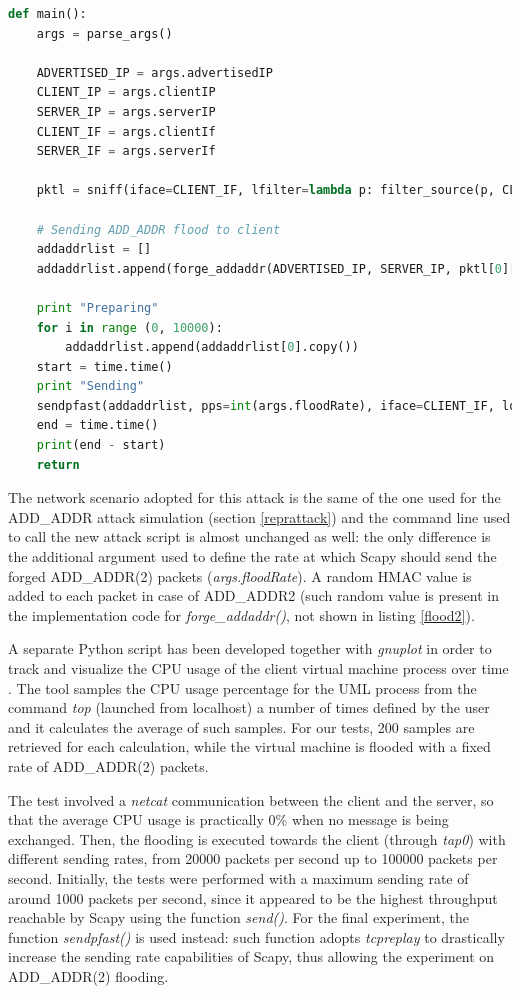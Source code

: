 \begin{lstlisting}[language=Python, caption=Scapy flooding tool (\textit{main()} function), label=flood2]
def main():
    args = parse_args()

    ADVERTISED_IP = args.advertisedIP
    CLIENT_IP = args.clientIP
    SERVER_IP = args.serverIP
    CLIENT_IF = args.clientIf
    SERVER_IF = args.serverIf

    pktl = sniff(iface=CLIENT_IF, lfilter=lambda p: filter_source(p, CLIENT_IP), count=1)

    # Sending ADD_ADDR flood to client
    addaddrlist = []
    addaddrlist.append(forge_addaddr(ADVERTISED_IP, SERVER_IP, pktl[0][TCP].dport, CLIENT_IP, pktl[0][TCP].sport, (pktl[0][TCP].ack)+SEQUENCE_OFFSET, (pktl[0][TCP].seq)-SEQUENCE_OFFSET))
    
    print "Preparing"
    for i in range (0, 10000):
        addaddrlist.append(addaddrlist[0].copy())
    start = time.time()
    print "Sending"
    sendpfast(addaddrlist, pps=int(args.floodRate), iface=CLIENT_IF, loop=10000, file_cache=True)
    end = time.time()
    print(end - start)
    return
\end{lstlisting}

The network scenario adopted for this attack is the same of the one used for the ADD\_ADDR attack simulation (section \ref{reprattack}) and the command line used to call the new attack script is almost unchanged as well: the only difference is the additional argument used to define the rate at which Scapy should send the forged ADD\_ADDR(2) packets (\textit{args.floodRate}). A random HMAC value is added to each packet in case of ADD\_ADDR2 (such random value is present in the implementation code for \textit{forge\_addaddr()}, not shown in listing \ref{flood2}).

A separate Python script has been developed together with \textit{gnuplot} in order to track and visualize the CPU usage of the client virtual machine process over time \cite{monitor}. The tool samples the CPU usage percentage for the UML process from the command \textit{top} (launched from localhost) a number of times defined by the user and it calculates the average of such samples. For our tests, 200 samples are retrieved for each calculation, while the virtual machine is flooded with a fixed rate of ADD\_ADDR(2) packets.

The test involved a \textit{netcat} communication between the client and the server, so that the average CPU usage is practically 0\% when no message is being exchanged. Then, the flooding is executed towards the client (through \textit{tap0}) with different sending rates, from 20000 packets per second up to 100000 packets per second. Initially, the tests were performed with a maximum sending rate of around 1000 packets per second, since it appeared to be the highest throughput reachable by Scapy using the function \textit{send()}. For the final experiment, the function \textit{sendpfast()} is used instead: such function adopts \textit{tcpreplay} to drastically increase the sending rate capabilities of Scapy, thus allowing the experiment on ADD\_ADDR(2) flooding. 

